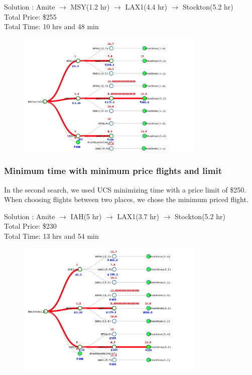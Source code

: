 \documentclass[11pt]{article}
\begin{document}
\begin{center}
Solution : Amite $\rightarrow$ MSY(1.2 hr) $\rightarrow$ LAX1(4.4 hr) $\rightarrow$ Stockton(5.2 hr) \\
\quad Total Price: \$255 \\
\quad Total Time: 10 hrs and 48 min
\end{center}

\begin{figure}[!ht]
  \centering
  \includegraphics[width=0.8\textwidth]{time}
  \label{fig:time}
\end{figure}

\pagebreak

\subsubsection{Minimum time with minimum price flights and limit}

In the second search, we used UCS minimizing time with a price limit of \$250. When choosing flights between two places, we chose the minimum priced flight.

\begin{center}
Solution : Amite $\rightarrow$ IAH(5 hr) $\rightarrow$ LAX1(3.7 hr) $\rightarrow$ Stockton(5.2 hr) \\
\quad Total Price: \$230 \\
\quad Total Time: 13 hrs and 54 min\\
\end{center}

\begin{figure}[!ht]
  \centering
  \includegraphics[width=0.8\textwidth]{time_lim}
  \label{fig:time_lim}
\end{figure}
\end{document}
